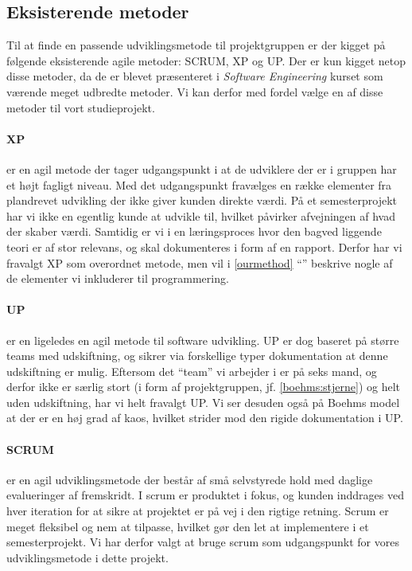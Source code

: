 \subsection{Eksisterende metoder}\label{existing}
Til at finde en passende udviklingsmetode til projektgruppen er der kigget på følgende eksisterende agile metoder: SCRUM, XP og UP.\cite{larman}
Der er kun kigget netop disse metoder, da de er blevet præsenteret i \emph{Software Engineering} kurset som værende meget udbredte metoder.
Vi kan derfor med fordel vælge en af disse metoder til vort studieprojekt.


\paragraph{XP} er en agil metode der tager udgangspunkt i at de udviklere der er i gruppen har et højt fagligt niveau.
Med det udgangspunkt fravælges en række elementer fra plandrevet udvikling der ikke giver kunden direkte værdi.
På et semesterprojekt har vi ikke en egentlig kunde at udvikle til, hvilket påvirker afvejningen af hvad der skaber værdi.
Samtidig er vi i en læringsproces hvor den bagved liggende teori er af stor relevans, og skal dokumenteres i form af en rapport.
Derfor har vi fravalgt XP som overordnet metode, men vil i \cref{ourmethod} ``'' beskrive nogle af de elementer vi inkluderer til programmering.

\paragraph{UP} er en ligeledes en agil metode til software udvikling.
UP er dog baseret på større teams med udskiftning, og sikrer via forskellige typer dokumentation at denne udskiftning er mulig.
Eftersom det ``team'' vi arbejder i er på seks mand, og derfor ikke er særlig stort (i form af projektgruppen, jf. \cref{boehms:stjerne}) og helt uden udskiftning, har vi helt fravalgt UP.
Vi ser desuden også på Boehms model at der er en høj grad af kaos, hvilket strider mod den rigide dokumentation i UP.

\paragraph{SCRUM} er en agil udviklingsmetode der består af små selvstyrede hold med daglige evalueringer af fremskridt. 
I scrum er produktet i fokus, og kunden inddrages ved hver iteration for at sikre at projektet er på vej i den rigtige retning. Scrum er meget fleksibel og nem at tilpasse, hvilket gør den let at implementere i et semesterprojekt. 
Vi har derfor valgt at bruge scrum som udgangspunkt for vores udviklingsmetode i dette projekt.
